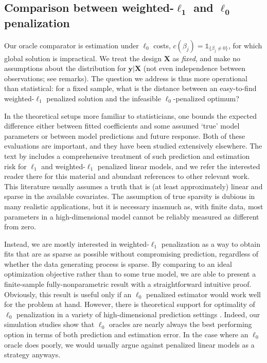 \documentclass[12pt]{article}
\newcommand{\bs}[1]{\boldsymbol{#1}}
\newcommand{\bm}[1]{\mathbf{#1}}
\newcommand{\ds}[1]{\mathds{#1}}
\begin{document}
\subsection{Comparison between weighted-$\bs{\ell_1}$ and $\bs{\ell_0}$ penalization}


Our oracle comparator is estimation under $\ell_0$ costs, $c(\beta_j) =
\ds{1}_{\{\beta_j\neq0\}}$, for which global solution is impractical.  We
treat the design $\bm{X}$ as {\it fixed}, and make no assumptions
about the distribution for $\bm{y} | \bm{X}$ (not even independence between
observations; see remarks).   The question we address is thus more
operational than statistical: for a fixed sample, what is the distance between
an easy-to-find weighted-$\ell_1$ penalized solution and the infeasible
$\ell_0$-penalized optimum?

In the theoretical setups more familiar to statisticians,
one bounds the expected difference  either between fitted coefficients
and some assumed `true' model parameters or  between model predictions and future
response.  Both of these evaluations are important, and they have been studied
extensively elsewhere. The text by \cite{buhlmann_statistics_2011}
includes a comprehensive treatment of such prediction and estimation risk for
$\ell_1$ and weighted-$\ell_1$ penalized linear models,  and we refer the
interested reader there for this material and abundant references to other
relevant work.  This literature usually assumes a truth that is (at least
approximately) linear and sparse in the available covariates.  The assumption
of true sparsity is dubious in many realistic applications, but it is
necessary inasmuch as, with finite data, most parameters in a
high-dimensional model cannot be reliably measured as different from zero.

Instead, we are mostly interested in weighted-$\ell_1$ penalization as a way
to obtain fits that are as sparse as possible without compromising prediction, regardless of whether the data generating process is sparse.  By
comparing to an ideal optimization objective rather than to some true model,
we are able to present a finite-sample fully-nonparametric result with a
straightforward intuitive proof. Obviously, this result is useful only if
an $\ell_0$ penalized estimator would work well for the
problem at hand. However,  there is theoretical support for optimality of
$\ell_0$ penalization in a  variety of high-dimensional prediction settings
\citep[e.g,][]{mallows_comments_1973,efron_estimation_2004}.  Indeed, our
simulation studies show that $\ell_0$ oracles are nearly always the best
performing option in terms of both prediction and estimation error.  In the
case where an $\ell_0$ oracle does poorly, we would usually argue against
penalized linear models as a strategy anyways.
\end{document}
